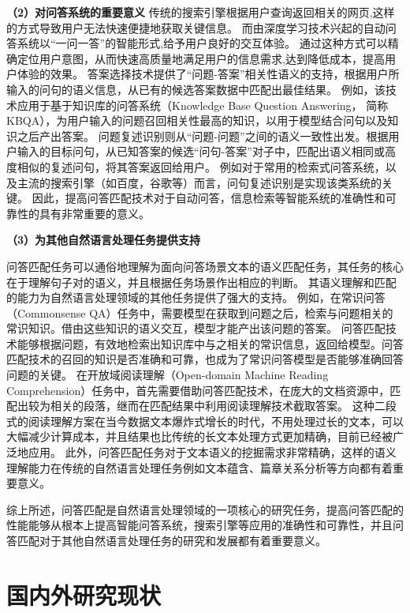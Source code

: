 \textbf{\songti（2）对问答系统的重要意义}
传统的搜索引擎根据用户查询返回相关的网页,这样的方式导致用户无法快速便捷地获取关键信息。
而由深度学习技术兴起的自动问答系统以“一问一答”的智能形式,给予用户良好的交互体验。
通过这种方式可以精确定位用户意图，从而快速高质量地满足用户的信息需求,达到降低成本，提高用户体验的效果。
答案选择技术提供了“问题-答案”相关性语义的支持，根据用户所输入的问句的语义信息，从已有的候选答案数据中匹配出最佳结果。
例如，该技术应用于基于知识库的问答系统（Knowledge Base Question Answering， 简称KBQA），为用户输入的问题召回相关性最高的知识，以用于模型结合问句以及知识之后产出答案。
问题复述识别则从“问题-问题”之间的语义一致性出发。根据用户输入的目标问句，从已知答案的候选“问句-答案”对子中，匹配出语义相同或高度相似的复述问句，将其答案返回给用户。
例如对于常用的检索式问答系统，以及主流的搜索引擎（如百度，谷歌等）而言，问句复述识别是实现该类系统的关键。
因此，提高问答匹配技术对于自动问答，信息检索等智能系统的准确性和可靠性的具有非常重要的意义。


\textbf{\songti（3）为其他自然语言处理任务提供支持}

问答匹配任务可以通俗地理解为面向问答场景文本的语义匹配任务，其任务的核心在于理解句子对的语义，并且根据任务场景作出相应的判断。
其语义理解和匹配的能力为自然语言处理领域的其他任务提供了强大的支持。
例如，在常识问答（Commonsense QA）任务中，需要模型在获取到问题之后，检索与问题相关的常识知识。借由这些知识的语义交互，模型才能产出该问题的答案。
问答匹配技术能够根据问题，有效地检索出知识库中与之相关的常识信息，返回给模型。问答匹配技术的召回的知识是否准确和可靠，也成为了常识问答模型是否能够准确回答问题的关键。
在开放域阅读理解（Open-domain Machine Reading Comprehension）任务中，首先需要借助问答匹配技术，在庞大的文档资源中，匹配出较为相关的段落，继而在匹配结果中利用阅读理解技术截取答案。
这种二段式的阅读理解方案在当今数据文本爆炸式增长的时代，不用处理过长的文本，可以大幅减少计算成本，并且结果也比传统的长文本处理方式更加精确，目前已经被广泛地应用。
此外，问答匹配任务对于文本语义的挖掘需求非常精确，这样的语义理解能力在传统的自然语言处理任务例如文本蕴含、篇章关系分析等方向都有着重要意义。

综上所述，问答匹配是自然语言处理领域的一项核心的研究任务，提高问答匹配的性能能够从根本上提高智能问答系统，搜索引擎等应用的准确性和可靠性，并且问答匹配对于其他自然语言处理任务的研究和发展都有着重要意义。

\section{国内外研究现状}

